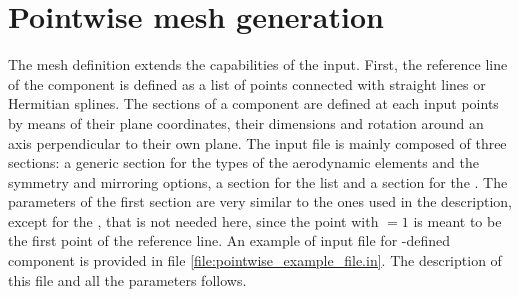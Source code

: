 \section{Pointwise mesh generation}
\label{sec:Pointwise_mesh_generation}
%
The  mesh definition extends the capabilities of the  input. First, the reference line of the component is defined as a list of points connected with straight lines or Hermitian splines. The sections of a component are defined at each input points by means of their plane coordinates, their dimensions and rotation around an axis perpendicular to their own plane.
%
The input file is mainly composed of three sections: a generic section for the types of the aerodynamic elements and the symmetry and mirroring options, a section for the  list and a section for the . The parameters of the first section are very similar to the ones used in the  description, except for the , that is not needed here, since the point with $=1$ is meant to be the first point of the reference line.
\newline \noindent
%
An example of input file for -defined component is provided in file \ref{file:pointwise_example_file.in}. The description of this file and all the parameters follows.
%


